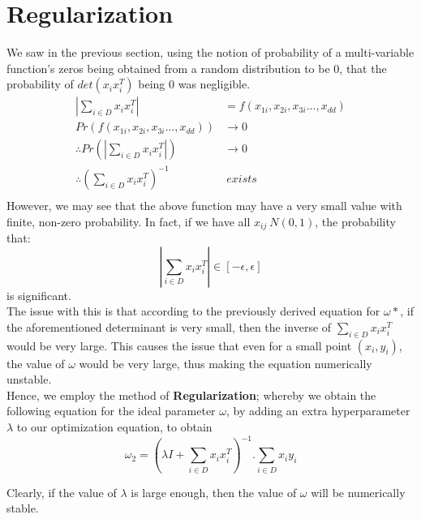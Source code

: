 \documentclass[11pt, twosides]{article}
\begin{document}
\section{Regularization}
We saw in the previous section, using the notion of probability of a multi-variable function's zeros being obtained from a random distribution to be $0$, that the probability of $det(x_ix_i^T)$ being $0$ was negligible.
\color{blue}
\begin{align*}
    |\sum_{i \in D} x_ix_i^T| &= f(x_{1i},x_{2i},x_{3i}...,x_{dd})\\
    Pr(f(x_{1i},x_{2i},x_{3i}...,x_{dd})) &\rightarrow 0\\
    \therefore Pr(|\sum_{i \in D} x_ix_i^T|) &\rightarrow 0\\
    \therefore (\sum_{i \in D}x_ix_i^T)^{-1}\ &\ exists\\
\end{align*}
\color{black}
However, we may see that the above function may have a very small value with finite, non-zero probability. In fact, if we have all $x_{ij} ~ N(0,1)$, the probability that: 
\color{blue}
\begin{equation*}
|\sum_{i \in D} x_ix_i^T| \in [-\epsilon,\epsilon]\end{equation*}
\color{black} is significant.\\

The issue with this is that according to the previously derived equation for $\omega*$, if the aforementioned determinant is very small, then the inverse of $\sum_{i \in D} x_ix_i^T$ would be very large. This causes the issue that even for a small point $(x_i, y_i)$, the value of $\omega$ would be very large, thus making the equation numerically unstable.\\

Hence, we employ the method of {\bf Regularization}; whereby we obtain the following equation for the ideal parameter $\omega$, by adding an extra hyperparameter $\lambda$ to our optimization equation, to obtain\\
\begin{equation*}
    \omega_2 = (\lambda I + \sum_{i \in D} x_ix_i^T)^{-1} . \sum_{i \in D} x_iy_i
\end{equation*}

Clearly, if the value of $\lambda$ is large enough, then the value of $\omega$ will be numerically stable.\\
\end{document}
